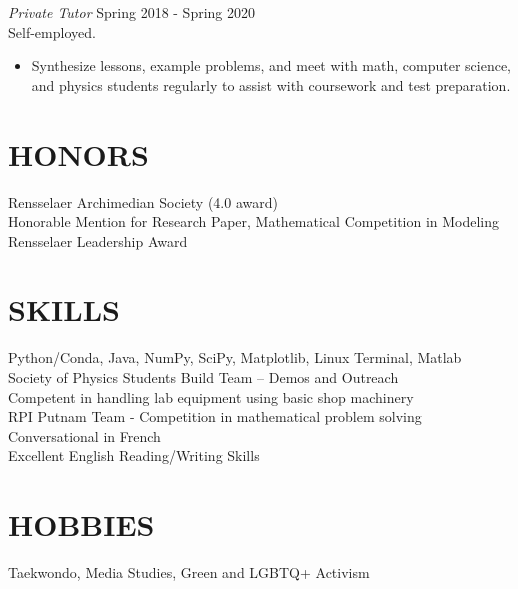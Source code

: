\documentclass[margin]{rpires}
\begin{document}
\begin{resume}
    {\sl Private Tutor} \hfill Spring 2018 - Spring 2020 \\
    Self-employed.
    \begin{itemize}  \itemsep -2pt %
        \item Synthesize lessons, example problems, and meet with math, computer science, and physics students regularly to assist with coursework and test preparation.
    \end{itemize}
    
    
\section{HONORS} Rensselaer Archimedian Society (4.0 award) \\
                 Honorable Mention for Research Paper, Mathematical Competition in Modeling \\
                 Rensselaer Leadership Award 
 
\section{SKILLS}
Python/Conda, Java, NumPy, SciPy, Matplotlib, Linux Terminal, Matlab\\
Society of Physics Students Build Team – Demos and Outreach \\
Competent in handling lab equipment using basic shop machinery\\
RPI Putnam Team - Competition in mathematical problem solving\\
Conversational in French\\
Excellent English Reading/Writing Skills \\

 
\section{HOBBIES}         Taekwondo, Media Studies, Green and LGBTQ+ Activism
 
\end{resume} 
\end{document}
